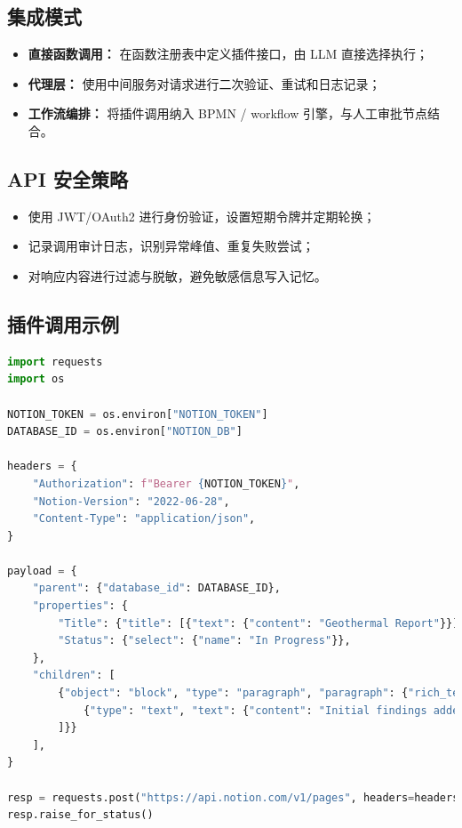 \documentclass[UTF8,zihao=-4]{ctexart}
\begin{document}
\subsection{集成模式}
\begin{itemize}
  \item \textbf{直接函数调用：} 在函数注册表中定义插件接口，由 LLM 直接选择执行；
  \item \textbf{代理层：} 使用中间服务对请求进行二次验证、重试和日志记录；
  \item \textbf{工作流编排：} 将插件调用纳入 BPMN / workflow 引擎，与人工审批节点结合。
\end{itemize}

\subsection{API 安全策略}
\begin{itemize}
  \item 使用 JWT/OAuth2 进行身份验证，设置短期令牌并定期轮换；
  \item 记录调用审计日志，识别异常峰值、重复失败尝试；
  \item 对响应内容进行过滤与脱敏，避免敏感信息写入记忆。
\end{itemize}

\subsection{插件调用示例}
\begin{lstlisting}[language=Python,caption={调用 Notion 数据库插件并写入结果}]
import requests
import os

NOTION_TOKEN = os.environ["NOTION_TOKEN"]
DATABASE_ID = os.environ["NOTION_DB"]

headers = {
    "Authorization": f"Bearer {NOTION_TOKEN}",
    "Notion-Version": "2022-06-28",
    "Content-Type": "application/json",
}

payload = {
    "parent": {"database_id": DATABASE_ID},
    "properties": {
        "Title": {"title": [{"text": {"content": "Geothermal Report"}}]},
        "Status": {"select": {"name": "In Progress"}},
    },
    "children": [
        {"object": "block", "type": "paragraph", "paragraph": {"rich_text": [
            {"type": "text", "text": {"content": "Initial findings added by tool agent."}}
        ]}}
    ],
}

resp = requests.post("https://api.notion.com/v1/pages", headers=headers, json=payload, timeout=15)
resp.raise_for_status()
\end{lstlisting}
\end{document}
